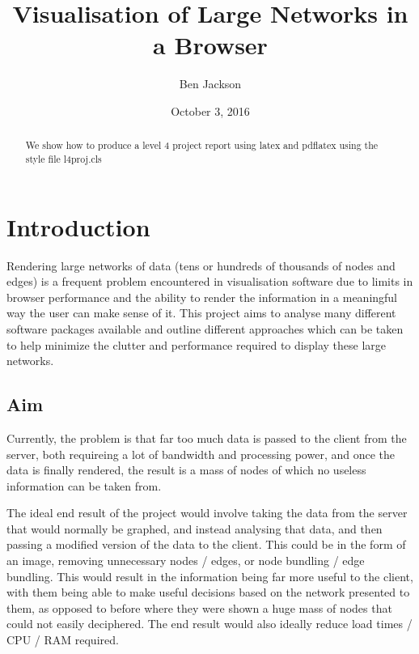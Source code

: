 \documentclass{l4proj}
\begin{document}
\title{Visualisation of Large Networks in a Browser}
\author{Ben Jackson}
\date{October 3, 2016}
\maketitle

\begin{abstract}
We show how to produce a level 4 project report using latex and pdflatex using the
style file l4proj.cls
\end{abstract}

\educationalconsent
%
%
\tableofcontents

\chapter{Introduction}
Rendering large networks of data (tens or hundreds of thousands of nodes and edges) is a frequent problem encountered in visualisation software due to limits in browser performance and the ability to render the information in a meaningful way the user can make sense of it. This project aims to analyse many different software packages available and outline different approaches which can be taken to help minimize the clutter and performance required to display these large networks. 
 
\section{Aim}
Currently, the problem is that far too much data is passed to the client from the server, both requireing a lot of bandwidth and processing power, and once the data is finally rendered, the result is a mass of nodes of which no useless information can be taken from. 

The ideal end result of the project would involve taking the data from the server that would normally be graphed, and instead analysing that data, and then passing a modified version of the data to the client. This could be in the form of an image, removing unnecessary nodes / edges, or node bundling / edge bundling. This would result in the information being far more useful to the client, with them being able to make useful decisions based on the network presented to them, as opposed to before where they were shown a huge mass of nodes that could not easily deciphered. The end result would also ideally reduce load times / CPU / RAM required. 
\end{document}
